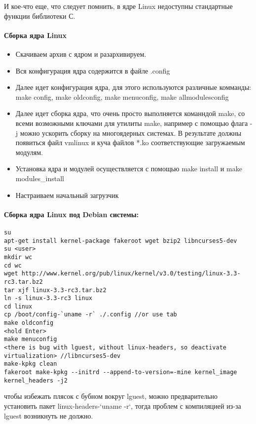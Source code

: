 И кое-что еще, что следует помнить, в ядре Linux недоступны стандартные функции библиотеки С.

\paragraph{Сборка ядра Linux}

\begin{itemize}
\item Скачиваем архив с ядром и разархивируем.

\item Вся конфигурация ядра содержится в файле .config

\item Далее идет конфигурация ядра, для этого используются различные комманды: make config, make oldconfig, make menuconfig,
make allmodulesconfig

\item Далее идет сборка ядра, что очень просто выполняется команндой make, со всеми возможными ключами для утилиты make, например с
помощью флага -j можно ускорить сборку на многоядерных системах. В результате должны появиться файл vmlinux и куча файлов *.ko
соответствующие загружаемым модулям.

\item Установка ядра и модулей осуществляется с помощью make install и make modules\_install

\item Настраиваем начальный загрузчик
\end{itemize}

\paragraph{Сборка ядра Linux под Debian системы:}

\begin{lstlisting}
su
apt-get install kernel-package fakeroot wget bzip2 libncurses5-dev
su <user>
mkdir wc
cd wc
wget http://www.kernel.org/pub/linux/kernel/v3.0/testing/linux-3.3-rc3.tar.bz2
tar xjf linux-3.3-rc3.tar.bz2
ln -s linux-3.3-rc3 linux
cd linux
cp /boot/config-`uname -r` ./.config //or use tab
make oldconfig
<hold Enter>
make menuconfig
<there is bug with lguest, without linux-headers, so deactivate virtualization> //libncurses5-dev
make-kpkg clean
fakeroot make-kpkg --initrd --append-to-version=-mine kernel_image kernel_headers -j2
\end{lstlisting}

чтобы избежать плясок с бубном вокруг lguest, можно предварительно установить пакет linux-headers-`uname -r`, тогда проблем с компиляцией из-за lguest
возникнуть не должно.

